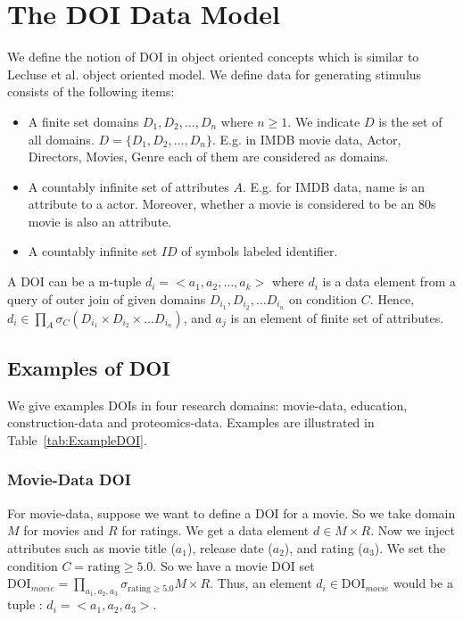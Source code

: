 \section{The DOI Data Model}
\label{sec:DataModel}

We define the notion of DOI in object oriented concepts which is similar to Lecluse et al. \cite{lecluse1988o2} object oriented model. 
We define data for generating stimulus consists of the following items:
\begin{itemize}
	\item A finite set domains $D_1, D_2, \ldots, D_n$ where $n \geq 1$. We indicate $D$ is the set of all domains. $D = \{D_1, D_2, \ldots, D_n\}$. E.g. in IMDB movie data, Actor, Directors, Movies, Genre each of them are considered as domains.
	\item A countably infinite set of attributes $A$. E.g. for IMDB data, name is an attribute to a actor. Moreover, whether a movie is considered to be an 80s movie is also an attribute. 
	\item A countably infinite set $ID$ of symbols labeled identifier. 
\end{itemize}

A DOI can be a m-tuple $d_i= <a_1 , a_2, \ldots, a_k>$ where $d_i$ is a data element from a query of outer join of given domains $D_{i_1}, D_{i_2}, \ldots D_{i_n}$ on condition $C$. Hence, $d_i \in \prod_{A} \sigma _{C} (D_{i_1} \times D_{i_2} \times \ldots D_{i_n})$, and $a_j$ is an element of finite set of attributes. 

\subsection{Examples of DOI}
We give examples DOIs in four research domains: movie-data, education, construction-data and proteomics-data. Examples are illustrated in Table~\ref{tab:ExampleDOI}.

\subsubsection{Movie-Data DOI}

For movie-data, suppose we want to define a DOI for a movie. So we take domain $M$ for movies and $R$ for ratings. We get a data element $d \in M \times R$. Now we inject attributes such as movie title ($a_1$), release date ($a_2$), and rating ($a_3$). We set the condition $C= \text{rating} \geq 5.0$. So we have a movie DOI set $\text{DOI}_{movie} = \prod_{a_1,a_2,a_3}\sigma_{\text{rating} \geq 5.0} M \times R$. Thus, an element $d_i \in \text{DOI}_{movie}$ would be a tuple : $d_i =< a_1, a_2, a_3>$. 

